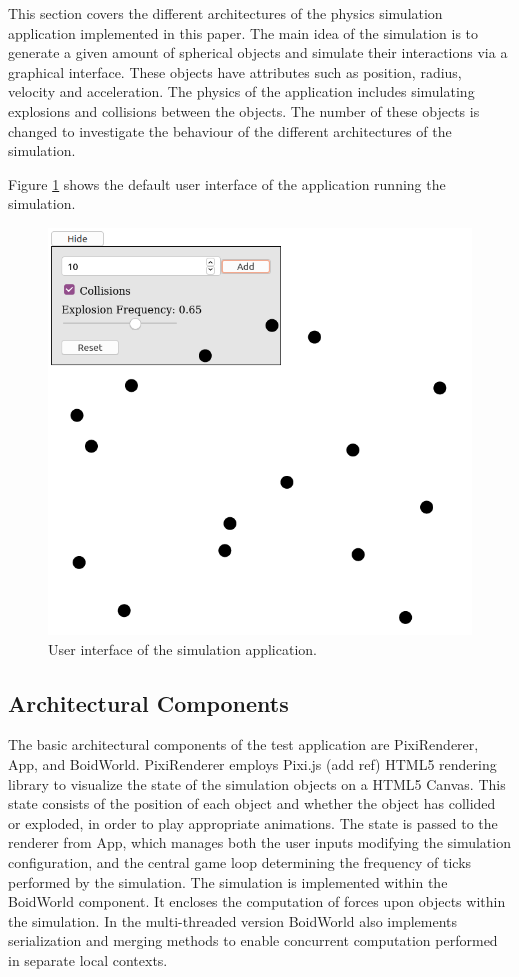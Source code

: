 \documentclass[conference]{IEEEtran}
\begin{document}
This section covers the different architectures of the physics simulation application implemented in this paper. The main idea of the simulation is to generate a given amount
of spherical objects and simulate their interactions via a graphical interface. These objects have attributes such as position, radius, velocity and acceleration. The 
physics of the application includes simulating explosions and collisions between the objects. The number of these objects is changed to investigate the behaviour
of the different architectures of the simulation.

Figure \ref{fig:figure2} shows the default user interface of the application running the simulation.

\begin{figure}[ht]
	\centering
	\includegraphics[scale=0.5]{figs/figure2.png}
	\caption{User interface of the simulation application.}
	\label{fig:figure2}
\end{figure}

\subsection{Architectural Components}
\label{sec:basic}

The basic architectural components of the test application are PixiRenderer, App, and BoidWorld. PixiRenderer employs Pixi.js (add ref) HTML5 rendering library to visualize the state of the simulation objects on a HTML5 Canvas. This state consists of the position of each object and whether the object has collided or exploded, in order to play appropriate animations. The state is passed to the renderer from App, which manages both the user inputs modifying the simulation configuration, and the central game loop determining the frequency of ticks performed by the simulation. The simulation is implemented within the BoidWorld component. It encloses the computation of forces upon objects within the simulation. In the multi-threaded version BoidWorld also implements serialization and merging methods to enable concurrent computation performed in separate local contexts.
\end{document}
